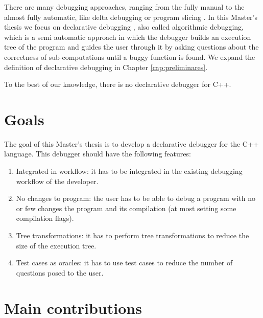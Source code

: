 
There are many debugging approaches, ranging from the fully manual to the almost fully automatic, like delta debugging or program slicing \cite{WhyProgramsFail}. In this Master's thesis we focus on declarative debugging \cite{shapiro1982algorithmic}, also called algorithmic debugging, which is a semi automatic approach in which the debugger builds an execution tree of the program and guides the user through it by asking questions about the correctness of sub-computations until a buggy function is found. We expand the definition of declarative debugging in Chapter \ref{cap:preliminares}.


To the best of our knowledge, there is no declarative debugger for C++.

\section{Goals}
The goal of this Master's thesis is to develop a declarative debugger for the C++ language.
This debugger should have the following features:
\begin{enumerate}
  \item Integrated in workflow: it has to be integrated in the existing debugging workflow of the developer. \label{goal1}
  \item No changes to program: the user has to be able to debug a program with no or few changes the program and its compilation (at most setting some compilation flags). \label{goal2}
  \item Tree transformations: it has to perform tree transformations to reduce the size of the execution tree. \label{goal3}
  \item Test cases as oracles: it has to use test cases to reduce the number of questions posed to the user. \label{goal4}
\end{enumerate}

\section{Main contributions}


